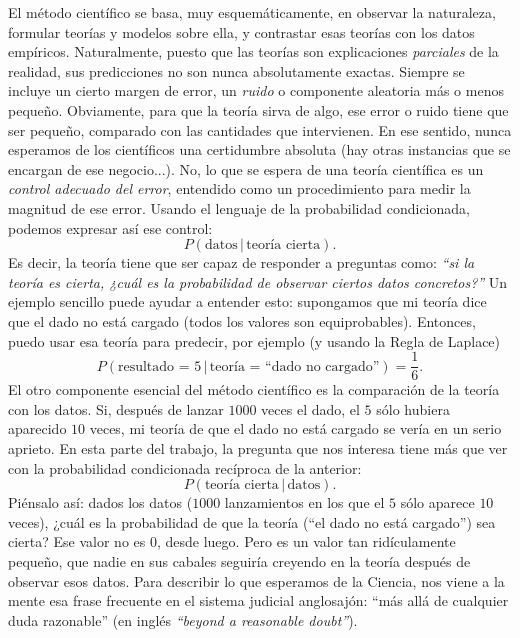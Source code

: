 El método científico se basa, muy esquemáticamente, en observar la naturaleza, formular teorías y modelos sobre ella, y contrastar esas teorías con los datos empíricos. Naturalmente, puesto que las teorías son explicaciones {\em parciales} de la realidad, sus predicciones no son nunca absolutamente exactas. Siempre se incluye un cierto margen de error, un {\em ruido} o componente aleatoria más o menos pequeño. Obviamente, para que la teoría sirva de algo, ese error o ruido tiene que ser pequeño, comparado con las cantidades que intervienen. En ese sentido, nunca esperamos de los científicos una certidumbre absoluta (hay otras instancias que se encargan de ese negocio...). No, lo que se espera de una teoría científica es un {\em control adecuado del error}, entendido como un procedimiento para medir la magnitud de ese error. Usando el lenguaje de la probabilidad condicionada, podemos expresar así ese control:
\[P\left(\mbox{datos}\,|\,\mbox{teoría cierta}\right).\]
Es decir, la teoría tiene que ser capaz de responder a preguntas como: {\em ``si la teoría es cierta, ¿cuál es la probabilidad de observar ciertos datos concretos?''} Un ejemplo sencillo puede ayudar a entender esto: supongamos que mi teoría dice que el dado no está cargado (todos los valores son equiprobables). Entonces, puedo usar esa teoría para predecir, por ejemplo (y usando la Regla de Laplace)
\[P\left(\mbox{resultado = }5\,|\,\mbox{teoría = ``dado no cargado''}\right)=\dfrac{1}{6}.\]
El otro componente esencial del método científico es la comparación de la teoría con los datos. Si, después de lanzar $1000$ veces el dado, el $5$ sólo hubiera aparecido $10$ veces, mi teoría de que el dado no está cargado se vería en un serio aprieto. En esta parte del trabajo, la pregunta que nos interesa tiene más que ver con la probabilidad condicionada recíproca de la anterior:
\[P\left(\mbox{teoría cierta}\,|\,\mbox{datos}\right).\]
Piénsalo así: dados los datos ($1000$ lanzamientos en los que el $5$ sólo aparece $10$ veces), ¿cuál es la probabilidad de que la teoría (``el dado no está cargado'') sea cierta? Ese valor no es $0$, desde luego. Pero es un valor tan ridículamente pequeño, que nadie en sus cabales seguiría creyendo en la teoría después de observar esos datos. Para describir lo que esperamos de la Ciencia, nos viene a la mente esa frase frecuente en el sistema judicial anglosajón: ``más allá de cualquier duda razonable'' (en inglés {\em ``beyond a reasonable doubt''}).

